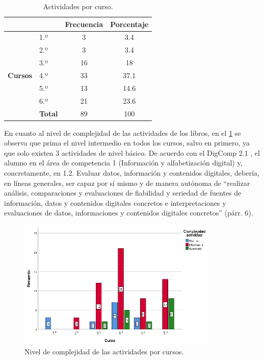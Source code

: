 \documentclass{textolivre}
\begin{document}
\begin{table}
\caption{Actividades por curso.}
\label{tbl02}
\small
\centering
\begin{tabular}{clcc}
\toprule
 & & \textbf{Frecuencia} & \textbf{Porcentaje} \\
\midrule
\multirow{7}{*}{\textbf{Cursos}} & {1.º} & 3 & 3.4 \\
 & 2.º            & 3           & 3.4  \\ 
 & 3.º            & 16          & 18   \\ 
 & 4.º            & 33          & 37.1 \\
 & 5.º            & 13          & 14.6 \\ 
 & 6.º            & 21          & 23.6 \\
 & \textbf{Total} & 89          & 100  \\
\bottomrule
\end{tabular}
\end{table}


En cuanto al nivel de complejidad de las actividades de los libros, en el \cref{Fig02} se observa que prima el nivel intermedio en todos los cursos, salvo en primero, ya que solo existen 3 actividades de nivel básico. De acuerdo con el DigComp 2.1 \cite{carretero_2018}, el alumno en el área de competencia 1 (Información y alfabetización digital) y, concretamente, en 1.2. Evaluar datos, información y contenidos digitales, debería, en líneas generales, ser capaz por sí mismo y de manera autónoma de “realizar análisis, comparaciones y evaluaciones de fiabilidad y seriedad de fuentes de información, datos y contenidos digitales concretos e interpretaciones y evaluaciones de datos, informaciones y contenidos digitales concretos” (párr. 6). 

\begin{figure}[htbp]
 \centering
 \includegraphics[width=0.85\textwidth]{Fig02.eps}
 \caption{Nivel de complejidad de las actividades por cursos.}
 \label{Fig02}
\end{figure}
\end{document}
